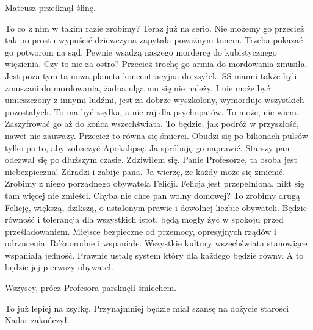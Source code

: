 Mateusz przełknął ślinę.

\begin{dialogue}
\ds{} To co z nim w takim razie zrobimy? Teraz już na serio. Nie możemy go przecież tak po prostu wypuścić \dm{} dziewczyna zapytała poważnym tonem.
\ds{} Trzeba pokazać go potworom na sąd. Pewnie wsadzą naszego mordercę do kubistycznego więzienia.
\ds{} Czy to nie za ostro? Przecież trochę go armia do mordowania zmusiła. Jest poza tym ta nowa planeta koncentracyjna do zsyłek.
\ds{} SS-manni także byli zmuszani do mordowania, żadna ulga mu się nie należy. 
I nie może być umieszczony z innymi ludźmi, jest za dobrze wyszkolony, wymorduje wszystkich pozostałych. To ma być zsyłka, a nie raj dla psychopatów.
\ds{} To może, nie wiem. Zaszyfrować go aż do końca wszechświata. To będzie, jak podróż w przyszłość, nawet nie zauważy.
\ds{} Przecież to równa się śmierci. Obudzi się po bilionach pulsów tylko po to, aby zobaczyć Apokalipsę.
\ds{} Ja spróbuję go naprawić. \dm{} Starszy pan odezwał się po dłuższym czasie. Zdziwiłem się.
\ds{} Panie Profesorze, ta osoba jest niebezpieczna! Zdradzi i zabije pana.
\ds{} Ja wierzę, że każdy może się zmienić. Zrobimy z niego porządnego obywatela Felicji.
\ds{} Felicja jest przepełniona, nikt się tam więcej nie zmieści. Chyba nie chce pan wolny domowej?
\ds{} To zrobimy drugą Felicję, większą, dzikszą, o ustalonym prawie i dowolnej liczbie obywateli. Będzie równość i tolerancja dla wszystkich istot, będą mogły żyć w spokoju przed prześladowaniem.
Miejsce bezpieczne od przemocy, opresyjnych rządów i odrzucenia. Różnorodne i wspaniałe. Wszystkie kultury wszechświata stanowiące wspaniałą jedność.
Prawnie ustalę system który dla każdego będzie równy.
A to będzie jej pierwszy obywatel.
\end{dialogue}

Wszyscy, prócz Profesora parsknęli śmiechem.

\begin{dialogue}
\ds{} To już lepiej na zsyłkę. Przynajmniej będzie miał szansę na dożycie starości \dm{} Nadar zakończył.
\end{dialogue}

